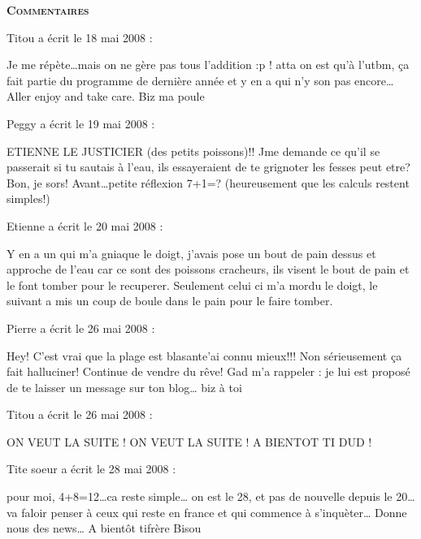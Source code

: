 \bigskip
\textbf{\textsc{Commentaires}}

\medskip
Titou a écrit le 18 mai 2008 :
\begin{displayquote}
Je me répète\dots mais on ne gère pas tous l'addition :p ! atta on est qu'à l'utbm, ça fait partie du programme de dernière année  et y en a qui n'y son pas encore\dots
Aller enjoy and take care. Biz ma poule
\end{displayquote}

\medskip
Peggy a écrit le 19 mai 2008 :
\begin{displayquote}
ETIENNE LE JUSTICIER (des petits poissons)!!
Jme demande ce qu'il se passerait si tu sautais à l'eau, ils essayeraient de te grignoter les fesses peut etre?
Bon, je sors!
Avant\dots petite réflexion 7+1=? (heureusement que les calculs restent simples!)
\end{displayquote}

\medskip
Etienne a écrit le 20 mai 2008 :
\begin{displayquote}
Y en a un qui m'a gniaque le doigt, j'avais pose un bout de pain dessus et approche de l'eau car ce sont des poissons cracheurs, ils visent le bout de pain et le font tomber pour le recuperer. Seulement celui ci m'a mordu le doigt, le suivant a mis un coup de boule dans le pain pour le faire tomber.
\end{displayquote}

\medskip
Pierre a écrit le 26 mai 2008 :
\begin{displayquote}
Hey!
C'est vrai que la plage est blasante\dotsj'ai connu mieux!!!
Non sérieusement ça fait halluciner!
Continue de vendre du rêve!
Gad m'a rappeler : je lui est proposé de te laisser un message sur ton blog\dots
biz à toi
\end{displayquote}

\medskip
Titou a écrit le 26 mai 2008 :
\begin{displayquote}
ON VEUT LA SUITE ! ON VEUT LA SUITE !
A BIENTOT TI DUD !
\end{displayquote}

\medskip
Tite soeur a écrit le 28 mai 2008 :
\begin{displayquote}
pour moi, 4+8=12\dots ca reste simple\dots
on est le 28, et pas de nouvelle depuis le 20\dots va faloir penser à ceux qui reste en france et qui commence à s'inquèter\dots
Donne nous des news\dots
A bientôt tifrère
Bisou
\end{displayquote}

\vfill
